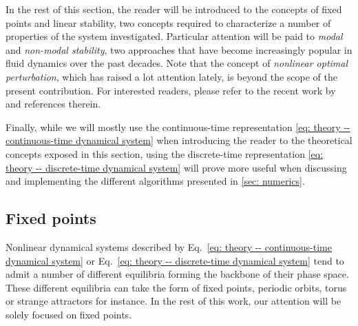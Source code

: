  In the rest of this section, the reader will be introduced to the concepts of fixed points and linear stability, two concepts required to characterize a number of properties of the system investigated. Particular attention will be paid to \emph{modal} and \emph{non-modal stability}, two approaches that have become increasingly popular in fluid dynamics over the past decades. Note that the concept of \emph{nonlinear optimal perturbation}, which has raised a lot attention lately, is beyond the scope of the present contribution. For interested readers, please refer to the recent work by \cite{nonlinear_optimal:kerswell:2014} and references therein.

  Finally, while we will mostly use the continuous-time representation \eqref{eq: theory -- continuous-time dynamical system} when introducing the reader to the theoretical concepts exposed in this section, using the discrete-time representation \eqref{eq: theory -- discrete-time dynamical system} will prove more useful when discussing and implementing the different algorithms presented in \textsection \ref{sec: numerics}.



  \subsection{Fixed points}
  \label{subsec: theory-fixed points}

  Nonlinear dynamical systems described by Eq.~\eqref{eq: theory -- continuous-time dynamical system} or Eq.~\eqref{eq: theory -- discrete-time dynamical system} tend to admit a number of different equilibria forming the backbone of their phase space. These different equilibria can take the form of fixed points, periodic orbits, torus or strange attractors for instance. In the rest of this work, our attention will be solely focused on fixed points.

